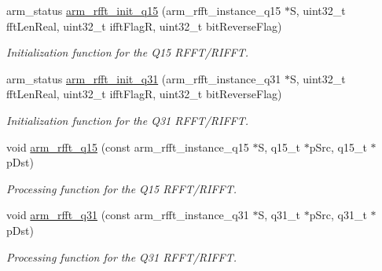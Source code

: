 \begin{DoxyCompactItemize}
\item 
arm\+\_\+status \hyperlink{group__RealFFT_ga053450cc600a55410ba5b5605e96245d}{arm\+\_\+rfft\+\_\+init\+\_\+q15} (arm\+\_\+rfft\+\_\+instance\+\_\+q15 $\ast$S, uint32\+\_\+t fft\+Len\+Real, uint32\+\_\+t ifft\+FlagR, uint32\+\_\+t bit\+Reverse\+Flag)
\begin{DoxyCompactList}\small\item\em Initialization function for the Q15 R\+F\+F\+T/\+R\+I\+F\+FT. \end{DoxyCompactList}\item 
arm\+\_\+status \hyperlink{group__RealFFT_ga5abde938abbe72e95c5bab080eb33c45}{arm\+\_\+rfft\+\_\+init\+\_\+q31} (arm\+\_\+rfft\+\_\+instance\+\_\+q31 $\ast$S, uint32\+\_\+t fft\+Len\+Real, uint32\+\_\+t ifft\+FlagR, uint32\+\_\+t bit\+Reverse\+Flag)
\begin{DoxyCompactList}\small\item\em Initialization function for the Q31 R\+F\+F\+T/\+R\+I\+F\+FT. \end{DoxyCompactList}\item 
void \hyperlink{group__RealFFT_ga00e615f5db21736ad5b27fb6146f3fc5}{arm\+\_\+rfft\+\_\+q15} (const arm\+\_\+rfft\+\_\+instance\+\_\+q15 $\ast$S, q15\+\_\+t $\ast$p\+Src, q15\+\_\+t $\ast$p\+Dst)
\begin{DoxyCompactList}\small\item\em Processing function for the Q15 R\+F\+F\+T/\+R\+I\+F\+FT. \end{DoxyCompactList}\item 
void \hyperlink{group__RealFFT_gabaeab5646aeea9844e6d42ca8c73fe3a}{arm\+\_\+rfft\+\_\+q31} (const arm\+\_\+rfft\+\_\+instance\+\_\+q31 $\ast$S, q31\+\_\+t $\ast$p\+Src, q31\+\_\+t $\ast$p\+Dst)
\begin{DoxyCompactList}\small\item\em Processing function for the Q31 R\+F\+F\+T/\+R\+I\+F\+FT. \end{DoxyCompactList}\end{DoxyCompactItemize}


